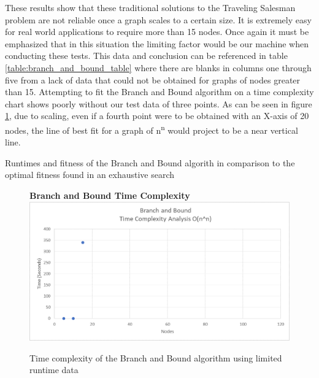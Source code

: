 \documentclass[sigplan,screen]{acmart}
\begin{document}
These results show that these traditional solutions to the Traveling Salesman
problem are not reliable once a graph scales to a certain size. It is extremely
easy for real world applications to require more than 15 nodes. Once again it
must be emphasized that in this situation the limiting factor would be our
machine when conducting these tests. This data and conclusion can be referenced
in table \ref{table:branch_and_bound_table} where there are blanks in columns
one through five from a lack of data that could not be obtained for graphs of
nodes greater than 15. Attempting to fit the Branch and Bound algorithm on a
time complexity chart shows poorly without our test data of three points. As
can be seen in figure \ref{fig:branch_and_bound_time_complexity}, due to
scaling, even if a fourth point were to be obtained with an X-axis of 20 nodes,
the line of best fit for a graph of n\textsuperscript{n} would project to be a
near vertical line.

\begin{table}[h]
    \setlength\tabcolsep{2pt}
    \centering
    
    \caption{Runtimes and fitness of the Branch and Bound algorith in comparison to the optimal fitness found in an exhaustive search}
    \label{table:branch_and_bound_table}
\end{table}

\begin{figure}[h]
    \centering
    \textbf{Branch and Bound Time Complexity}
    \includegraphics[width=\columnwidth]{assets/branch_and_bound_time_complexity.png}
    \caption{Time complexity of the Branch and Bound algorithm using limited runtime data}
    \label{fig:branch_and_bound_time_complexity}
\end{figure}
\end{document}
